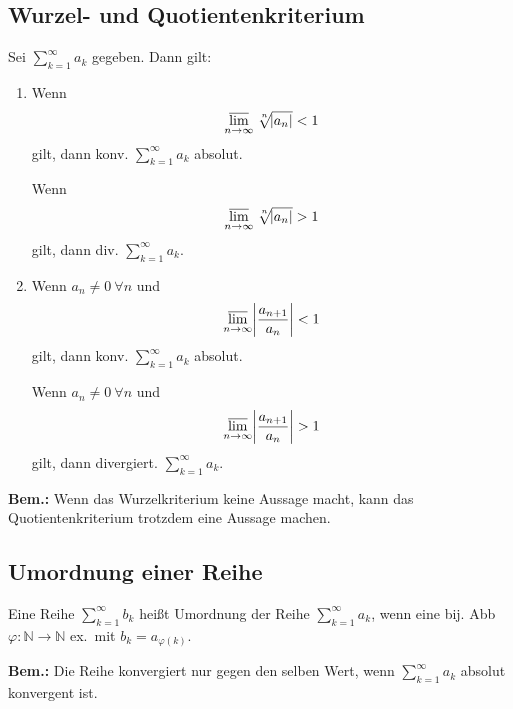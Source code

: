 \documentclass[10pt]{article}
\newcommand{\N}{\mathbb{N}}
\newcommand*{\nthSqrt}[2]{\sqrt[\leftroot{-2}\uproot{2}#1]{#2}}
\begin{document}
    \subsection{Wurzel- und Quotientenkriterium}
    Sei $\sum_{k=1}^\infty a_k$ gegeben. Dann gilt:
    \begin{enumerate}[label= (\alph*)]
        \item Wenn
            \begin{equation*}
                \varlimsup_{n \rightarrow \infty}
                \nthSqrt{n}{\abs{a_n}} < 1
            \end{equation*}
            gilt, dann konv. $\sum_{k=1}^\infty a_k$ absolut.

            Wenn
            \begin{equation*}
                \varlimsup_{n \rightarrow \infty}
                \nthSqrt{n}{\abs{a_n}} > 1
            \end{equation*}
            gilt, dann div. $\sum_{k=1}^\infty a_k$.
        \item Wenn $a_n \neq 0\ \forall n$ und
            \begin{equation*}
                \varlimsup_{n \rightarrow \infty}
                \abs{\frac{a_{n+1}}{a_n}} < 1
            \end{equation*}
            gilt, dann konv. $\sum_{k=1}^\infty a_k$ absolut.

            Wenn $a_n \neq 0\ \forall n$ und
            \begin{equation*}
                \varlimsup_{n \rightarrow \infty}
                \abs{\frac{a_{n+1}}{a_n}} > 1
            \end{equation*}
            gilt, dann divergiert. $\sum_{k=1}^\infty a_k$.
    \end{enumerate}
    \textbf{Bem.:} Wenn das Wurzelkriterium keine Aussage macht, kann das
    Quotientenkriterium trotzdem eine Aussage machen.

    \subsection{Umordnung einer Reihe}
    Eine Reihe $\sum_{k=1}^\infty b_k$ heißt Umordnung der Reihe
    $\sum_{k=1}^\infty a_k$,
    wenn eine bij. Abb $\varphi: \N \rightarrow \N$ ex.\ mit $b_k = a_{\varphi(k)}$.

    \textbf{Bem.:}
    Die Reihe konvergiert nur gegen den selben Wert, wenn $\sum_{k=1}^\infty a_k$
    absolut konvergent ist.
\end{document}
